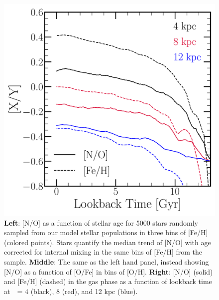 \documentclass[ms.tex]{subfiles}
\begin{document}
\begin{figure}
\includegraphics[scale = 0.3]{no_feh_vs_lookback.pdf} 
\caption{
\textbf{Left}: [N/O] as a function of stellar age for 5000 stars randomly 
sampled from our model stellar populations in three bins of [Fe/H] (colored 
points). 
Stars quantify the median trend of [N/O] with age corrected for internal mixing 
in the same bins of [Fe/H] from the~\citet{Vincenzo2021} sample. 
\textbf{Middle}: The same as the left hand panel, instead showing [N/O] as a 
function of [O/Fe] in bins of [O/H]. 
\textbf{Right}: [N/O] (solid) and [Fe/H] (dashed) in the gas phase as a 
function of lookback time at~\rgal~= 4 (black), 8 (red), and 12 kpc (blue). 
} 
\label{fig:vincenzo_comp} 
\end{figure} 
\end{document}
